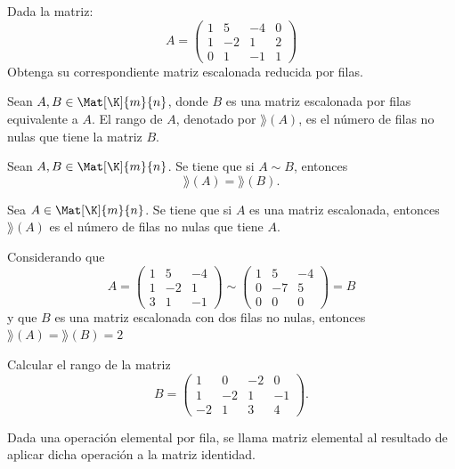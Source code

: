 \documentclass[compacto,10pt]{pubciencias-notas}
\begin{document}
\begin{ejer}
Dada la matriz:
\[
    A=\begin{pmatrix}
    1&5&-4&0\\
    1&-2&1&2\\
    0&1&-1&1
    \end{pmatrix}
\]
Obtenga su correspondiente matriz escalonada reducida por filas.
\end{ejer}

\begin{defi}
    Sean $A, B\in\Mat[\K]{m}{n}$, donde 
    $B$ es una matriz escalonada por filas 
    equivalente a $A$. 
    El rango de $A$, denotado por $\rang(A)$, es el número de filas no nulas que tiene la matriz $B$.  
\end{defi}

\begin{prop}
    Sean $A, B\in\Mat[\K]{m}{n}$. Se tiene que si $A\sim B$, entonces 
    \[
        \rang(A) = \rang(B).
    \]
\end{prop}

\begin{prop}
    Sea $A\in\Mat[\K]{m}{n}$. Se tiene que si $A$ es una matriz escalonada, entonces $\rang(A)$ es el número de filas no nulas que tiene $A$.
\end{prop}

\begin{ejem}\hspace{0pt} Considerando que
\[
    A=\begin{pmatrix}
        1&5&-4\\
        1&-2&1\\
        3&1&-1
    \end{pmatrix} \sim
    \begin{pmatrix}
        1&5&-4\\
        0&-7&5\\
        0&0&0
    \end{pmatrix}=B
\]
y que $B$ es una matriz escalonada con dos filas no nulas, entonces $\rang(A)=\rang(B)=2$
\end{ejem}

\begin{ejer} \label{Ejer:OpeELe} Calcular el rango de la matriz 
\[
    B=\begin{pmatrix}
    1&0&-2&0\\
    1&-2&1&-1\\
    -2&1&3&4
    \end{pmatrix}.
\]
\end{ejer}
\begin{defi}
    Dada una operación elemental por fila, se llama matriz elemental al resultado de aplicar dicha operación a la matriz identidad.
\end{defi}
\end{document}
